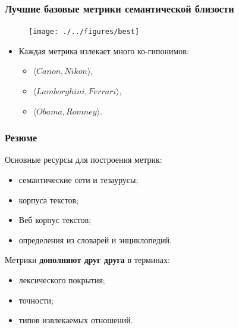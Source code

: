 \documentclass{beamer}
\begin{document}
\begin{frame}
\frametitle{Лучшие базовые метрики семантической близости}

\begin{figure}
\texttt{[image: ./../figures/best]}

\end{figure}

\begin{itemize}
  \item Каждая метрика излекает много \alert{ко-гипонимов}: 
  \begin{itemize}
  \item $\langle Canon, Nikon \rangle$,
  \item $\langle Lamborghini, Ferrari \rangle$,
  \item $\langle Obama, Romney \rangle$.
\end{itemize}
\end{itemize}
   
\end{frame}





\begin{frame}
\frametitle{Резюме}

\begin{block}{Основные ресурсы для построения метрик:}
\begin{itemize}
  \item семантические сети и тезаурусы;
  \item корпуса текстов;
  \item Веб корпус текстов;
  \item определения из словарей и энциклопедий. 
\end{itemize}
\end{block}   


\begin{block}{Метрики \textbf{дополняют друг друга} в терминах:}
\begin{itemize}
  \item лексического покрытия;
  \item точности;
  \item типов извлекаемых отношений. 
\end{itemize}
\end{block}   

\end{frame}
\end{document}

